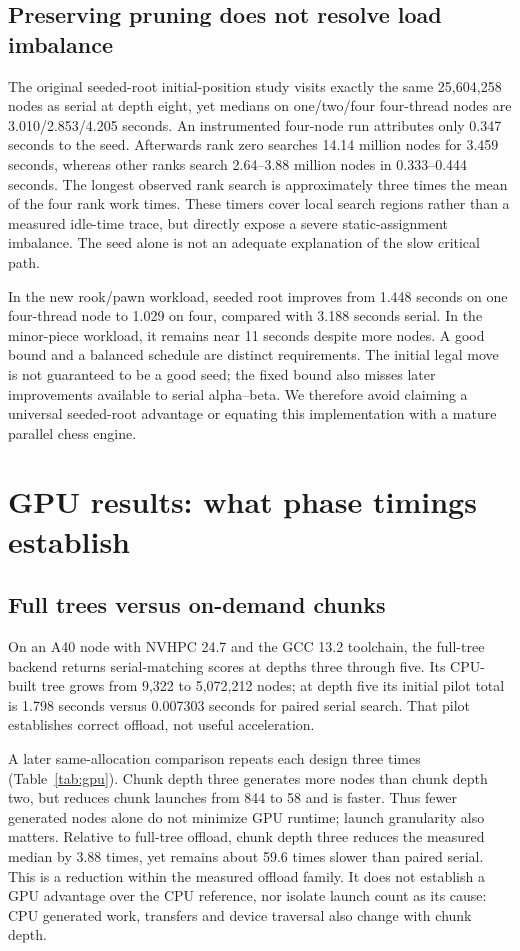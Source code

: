 \documentclass[11pt,a4paper]{article}
\begin{document}
\subsection{Preserving pruning does not resolve load imbalance}
The original seeded-root initial-position study visits exactly the same
25,604,258 nodes as serial at depth eight, yet medians on one/two/four
four-thread nodes are 3.010/2.853/4.205 seconds. An instrumented four-node run
attributes only 0.347 seconds to the seed. Afterwards rank zero searches
14.14 million nodes for 3.459 seconds, whereas other ranks search
2.64--3.88 million nodes in 0.333--0.444 seconds. The longest observed rank
search is approximately three times the mean of the four rank work times.
These timers cover local search regions rather than a measured idle-time trace,
but directly expose a severe static-assignment imbalance. The seed alone is
not an adequate explanation of the slow critical path.

In the new rook/pawn workload, seeded root improves from 1.448 seconds on one
four-thread node to 1.029 on four, compared with 3.188 seconds serial. In the
minor-piece workload, it remains near 11 seconds despite more nodes. A good
bound and a balanced schedule are distinct requirements. The initial legal
move is not guaranteed to be a good seed; the fixed bound also misses later
improvements available to serial alpha--beta. We therefore avoid claiming a
universal seeded-root advantage or equating this implementation with a mature
parallel chess engine.

\section{GPU results: what phase timings establish}
\subsection{Full trees versus on-demand chunks}
On an A40 node with NVHPC 24.7 and the GCC 13.2 toolchain, the full-tree
backend returns serial-matching scores at depths three through five. Its
CPU-built tree grows from 9,322 to 5,072,212 nodes; at depth five its initial
pilot total is 1.798 seconds versus 0.007303 seconds for paired serial search.
That pilot establishes correct offload, not useful acceleration.

A later same-allocation comparison repeats each design three times
(Table~\ref{tab:gpu}). Chunk depth three generates more nodes than chunk depth
two, but reduces chunk launches from 844 to 58 and is faster. Thus fewer
generated nodes alone do not minimize GPU runtime; launch granularity also
matters. Relative to full-tree offload, chunk depth three reduces the measured
median by 3.88 times, yet remains about 59.6 times slower than paired serial.
This is a reduction within the measured offload family. It does not establish
a GPU advantage over the CPU reference, nor isolate launch count as its cause: CPU
generated work, transfers and device traversal also change with chunk depth.
\end{document}
